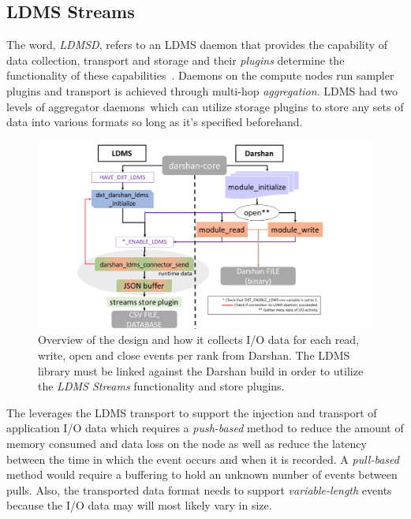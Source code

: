 \subsection{LDMS Streams}
The word, \emph{LDMSD}, refers to an LDMS daemon that provides the capability of data collection, transport and storage and their \emph{plugins} determine the functionality of these capabilities~\cite{ldmsgithubwiki}. Daemons on the compute nodes run sampler plugins and transport is achieved through multi-hop \emph{aggregation}. LDMS had two levels of aggregator daemons~\cite{ldmsgithubwiki}which can utilize storage plugins to store any sets of data into various formats so long as it's specified beforehand.

\begin{figure}
	\centering
	\includegraphics[trim={3.5cm 0 0 0},clip,
	width=1.15\linewidth]{figs/darshan-connector.pdf}
	\caption{Overview of the \connector design and how it collects I/O data for each read, write, open and close events per rank from Darshan. The LDMS library must be linked against the Darshan build in order to utilize the \emph{LDMS Streams} functionality and store plugins.}
	\label{f:Darshan Connector}
\end{figure}

The \Darshan leverages the LDMS transport to support the injection and transport of application I/O data which requires a \emph{push-based} method to reduce the amount of memory consumed and data loss on the node as well as reduce the latency between the time in which the event occurs and when it is recorded. A \emph{pull-based} method would require a buffering to hold an unknown number of events between pulls. Also, the transported data format needs to support  \emph{variable-length} events because the I/O data may will most likely vary in size. 

